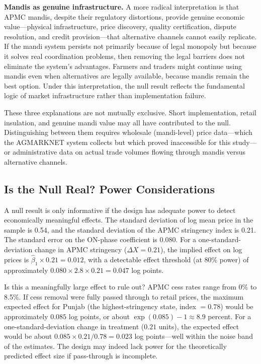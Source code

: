 \documentclass[12pt]{article}
\begin{document}
\textbf{Mandis as genuine infrastructure.} A more radical interpretation is that APMC mandis, despite their regulatory distortions, provide genuine economic value---physical infrastructure, price discovery, quality certification, dispute resolution, and credit provision---that alternative channels cannot easily replicate. If the mandi system persists not primarily because of legal monopoly but because it solves real coordination problems, then removing the legal barriers does not eliminate the system's advantages. Farmers and traders might continue using mandis even when alternatives are legally available, because mandis remain the best option. Under this interpretation, the null result reflects the fundamental logic of market infrastructure rather than implementation failure.

These three explanations are not mutually exclusive. Short implementation, retail insulation, and genuine mandi value may all have contributed to the null. Distinguishing between them requires wholesale (mandi-level) price data---which the AGMARKNET system collects but which proved inaccessible for this study---or administrative data on actual trade volumes flowing through mandis versus alternative channels.

\subsection{Is the Null Real? Power Considerations}

A null result is only informative if the design has adequate power to detect economically meaningful effects. The standard deviation of log mean price in the sample is 0.54, and the standard deviation of the APMC stringency index is 0.21. The standard error on the ON-phase coefficient is 0.080. For a one-standard-deviation change in APMC stringency ($\Delta X = 0.21$), the implied effect on log prices is $\hat{\beta}_1 \times 0.21 = 0.012$, with a detectable effect threshold (at 80\% power) of approximately $0.080 \times 2.8 \times 0.21 = 0.047$ log points.

Is this a meaningfully large effect to rule out? APMC cess rates range from 0\% to 8.5\%. If cess removal were fully passed through to retail prices, the maximum expected effect for Punjab (the highest-stringency state, index $= 0.78$) would be approximately $0.085$ log points, or about $\exp(0.085) - 1 \approx 8.9$ percent. For a one-standard-deviation change in treatment ($0.21$ units), the expected effect would be about $0.085 \times 0.21/0.78 = 0.023$ log points---well within the noise band of the estimates. The design may indeed lack power for the theoretically predicted effect size if pass-through is incomplete.
\end{document}
